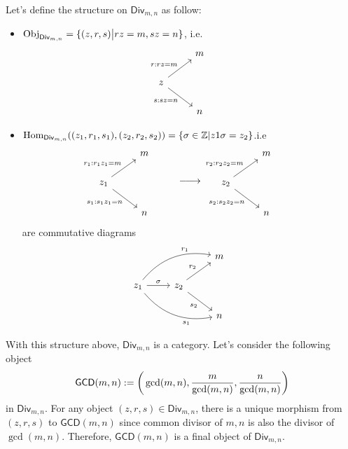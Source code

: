 \begin{solution}
Let's define the structure on $\mathsf{Div}_{m,n}$ as follow:
\begin{itemize}
\item $\mathrm{Obj}_{\mathsf{Div}_{m,n}}=\{(z, r, s)\big{|} rz=m, sz=n\}$, i.e.
%
\[
\begin{tikzcd}
& m\\
z \arrow[ur, "r: rz=m"] \arrow[dr, "s: sz=n"'] &\\
& n &
\end{tikzcd}
\]
\item $\mathrm{Hom}_{\mathsf{Div}_{m,n}}((z_1, r_1, s_1),(z_2,r_2,s_2)) = \{\sigma\in \mathbb{Z} | z1\sigma = z_2\}$.i.e
%
\[
\begin{tikzcd}
& m\\
z_1 \arrow[ur, "r_1: r_1z_1=m"] \arrow[dr, "s_1: s_1z_1=n"'] &\\
& n &
\end{tikzcd}
\DOTSB\relbar\joinrel\relbar\joinrel\rightarrow
\begin{tikzcd}
& m\\
z_2 \arrow[ur, "r_2: r_2z_2=m"] \arrow[dr, "s_2: s_2z_2=n"'] &\\
& n &
\end{tikzcd}
\]
are commutative diagrams
%
\[
\begin{tikzcd}
& &m\\
z_1\arrow[urr, bend left, "r_1" near end] \arrow[drr, bend right, "s_1"' near end] \arrow[r, "\sigma"] & z_2\arrow[ur, "r_2"] \arrow[dr, "s_2"']&\\
& &n&	
\end{tikzcd}
\]
\end{itemize}
With this structure above, $\mathsf{Div}_{m,n}$ is a category. Let's consider the following object 
$$\mathsf{GCD}(m,n):=\bigg{(}\gcd(m,n), \frac{m}{\gcd(m,n)}, \frac{n}{\gcd(m,n)}\bigg{)}$$ in $\mathsf{Div}_{m,n}$. For any object $(z, r, s)\in\mathsf{Div}_{m,n}$, there is a unique morphism from $(z, r, s)$ to $\mathsf{GCD}(m,n)$ 
since common divisor of $m,n$ is also the divisor of $\gcd(m,n)$. Therefore, $\mathsf{GCD}(m,n)$ is 
a final object of $\mathsf{Div}_{m,n}$.


\end{solution}
